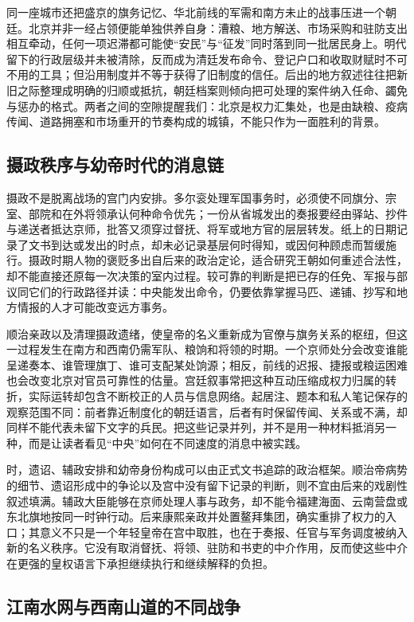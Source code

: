 同一座城市还把盛京的旗务记忆、华北前线的军需和南方未止的战事压进一个朝廷。北京并非一经占领便能单独供养自身：漕粮、地方解送、市场采购和驻防支出相互牵动，任何一项迟滞都可能使“安民”与“征发”同时落到同一批居民身上。明代留下的行政层级并未被清除，反而成为清廷发布命令、登记户口和收取财赋时不可不用的工具；但沿用制度并不等于获得了旧制度的信任。后出的地方叙述往往把新旧之际整理成明确的归顺或抵抗，朝廷档案则倾向把可处理的案件纳入任命、蠲免与惩办的格式。两者之间的空隙提醒我们：北京是权力汇集处，也是由缺粮、疫病传闻、道路拥塞和市场重开的节奏构成的城镇，不能只作为一面胜利的背景。

\subsection*{摄政秩序与幼帝时代的消息链}

摄政不是脱离战场的宫门内安排。多尔衮处理军国事务时，必须使不同旗分、宗室、部院和在外将领承认何种命令优先；一份从省城发出的奏报要经由驿站、抄件与递送者抵达京师，批答又须穿过督抚、将军或地方官的层层转发。纸上的日期记录了文书到达或发出的时点，却未必记录基层何时得知，或因何种顾虑而暂缓施行。摄政时期人物的褒贬多出自后来的政治定论，适合研究王朝如何重述合法性，却不能直接还原每一次决策的室内过程。较可靠的判断是把已存的任免、军报与部议同它们的行政路径并读：中央能发出命令，仍要依靠掌握马匹、递铺、抄写和地方情报的人才可能改变远方事务。

顺治亲政以及清理摄政遗绪，使皇帝的名义重新成为官僚与旗务关系的枢纽，但这一过程发生在南方和西南仍需军队、粮饷和将领的时期。一个京师处分会改变谁能呈递奏本、谁管理旗丁、谁可支配某处饷源；相反，前线的迟报、捷报或粮运困难也会改变北京对官员可靠性的估量。宫廷叙事常把这种互动压缩成权力归属的转折，实际运转却包含不断校正的人员与信息网络。起居注、题本和私人笔记保存的观察范围不同：前者靠近制度化的朝廷语言，后者有时保留传闻、关系或不满，却同样不能代表未留下文字的兵民。把这些记录并列，并不是用一种材料抵消另一种，而是让读者看见“中央”如何在不同速度的消息中被实践。

时，遗诏、辅政安排和幼帝身份构成可以由正式文书追踪的政治框架。顺治帝病势的细节、遗诏形成中的争论以及宫中没有留下记录的判断，则不宜由后来的戏剧性叙述填满。辅政大臣能够在京师处理人事与政务，却不能令福建海面、云南营盘或东北旗地按同一时钟行动。后来康熙亲政并处置鳌拜集团，确实重排了权力的入口；其意义不只是一个年轻皇帝在宫中取胜，也在于奏报、任官与军务调度被纳入新的名义秩序。它没有取消督抚、将领、驻防和书吏的中介作用，反而使这些中介在更强的皇权语言下承担继续执行和继续解释的负担。

\subsection*{江南水网与西南山道的不同战争}


